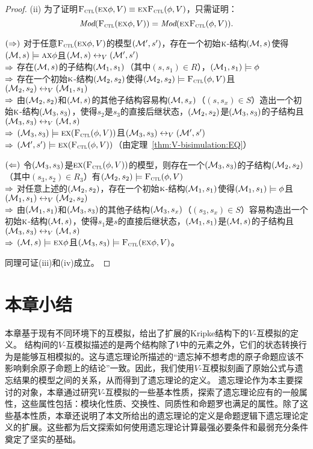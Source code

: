\begin{proof}
(ii) 为了证明${\textsc{F}_{\textsc{ctl}}}(\textsc{e} \textsc{x} \phi, V) \equiv \textsc{e}\textsc{x}{\textsc{F}_{\textsc{ctl}}}(\phi, V)$，只需证明：
\[\textit{Mod}({\textsc{F}_{\textsc{ctl}}}(\textsc{e} \textsc{x} \phi, V)) = \textit{Mod}( \textsc{e}\textsc{x}{\textsc{F}_{\textsc{ctl}}}(\phi, V)).\]

$(\Rightarrow)$ 对于任意${\textsc{F}_{\textsc{ctl}}}(\textsc{e}\textsc{x}\phi,V)$的模型$({\cal M}',s')$，存在一个初始$\textsc{k}$-结构$({\cal M},s)$使得$({\cal M},s)\models \textsc{a}\textsc{x}\phi$且$({\cal M},s)\leftrightarrow_V ({\cal M}',s')$\\
$\Rightarrow$ 存在$({\cal M},s)$的子结构$({\cal M}_1,s_1)$（其中$(s,s_1)\in R$），$({\cal M}_1,s_1)\models \phi$\\
$\Rightarrow$ 存在一个初始$\textsc{k}$-结构$({\cal M}_2,s_2)$使得$({\cal M}_2,s_2)\models {\textsc{F}_{\textsc{ctl}}}(\phi,V)$且$({\cal M}_2,s_2) \leftrightarrow_V ({\cal M}_1,s_1)$\\
$\Rightarrow$ 由$({\cal M}_2,s_2)$和$({\cal M},s)$的其他子结构容易构$({\cal M},s_x)$（$(s,s_x)\in S$）造出一个初始$\textsc{k}$-结构$({\cal M}_3,s_3)$，使得$s_2$是$s_3$的直接后继状态，$({\cal M}_2,s_2)$是$({\cal M}_3,s_3)$的子结构且$({\cal M}_3, s_3)\leftrightarrow_V ({\cal M},s)$\\
$\Rightarrow$ $({\cal M}_3,s_3) \models \textsc{e} \textsc{x}({\textsc{F}_{\textsc{ctl}}}(\phi,V))$且$({\cal M}_3,s_3) \leftrightarrow_V ({\cal M}',s')$\\
$\Rightarrow$ $({\cal M}',s')\models \textsc{e} \textsc{x}({\textsc{F}_{\textsc{ctl}}}(\phi,V))$（由定理~\ref{thm:V-bisimulation:EQ}）

$(\Leftarrow)$ 令$({\cal M}_3,s_3)$是$\textsc{e} \textsc{x}({\textsc{F}_{\textsc{ctl}}}(\phi,V))$的模型，则存在一个$({\cal M}_3,s_3)$的子结构$({\cal M}_2,s_2)$（其中$(s_3,s_2)\in R_3$）有$({\cal M}_2,s_2)\models {\textsc{F}_{\textsc{ctl}}}(\phi,V)$\\
$\Rightarrow$ 对任意上述的$({\cal M}_2,s_2)$，存在一个初始$\textsc{k}$-结构$({\cal M}_1,s_1)$使得$({\cal M}_1,s_1)\models \phi$且$({\cal M}_1,s_1)\leftrightarrow_V ({\cal M}_2,s_2)$\\
$\Rightarrow$ 由$({\cal M}_1,s_1)$和$({\cal M}_3,s_3)$的其他子结构$({\cal M}_3,s_x)$（$(s_3,s_x)\in S$）容易构造出一个初始$\textsc{k}$-结构$({\cal M},s)$，使得$s_1$是$s$的直接后继状态，$({\cal M}_1,s_1)$是$({\cal M},s)$的子结构且$({\cal M}_3, s_3)\leftrightarrow_V ({\cal M},s)$\\
$\Rightarrow$ $({\cal M},s)\models \textsc{e}\textsc{x}\phi$且$({\cal M}_3,s_3)\models {\textsc{F}_{\textsc{ctl}}}(\textsc{e}\textsc{x}\phi,V)$。

同理可证(iii)和(iv)成立。
\end{proof}



\section{本章小结} 
本章基于现有不同环境下的互模拟，给出了扩展的Kripke结构下的$V$-互模拟的定义。
结构间的$V$-互模拟描述的是两个结构除了$V$中的元素之外，它们的状态转换行为是能够互相模拟的。这与遗忘理论所描述的“遗忘掉不想考虑的原子命题应该不影响剩余原子命题上的结论”一致。因此，我们使用$V$-互模拟刻画了原始公式与遗忘结果的模型之间的关系，从而得到了遗忘理论的定义。
遗忘理论作为本主要探讨的对象，本章通过研究$V$-互模拟的一些基本性质，探索了遗忘理论应有的一般属性，这些属性包括：模块化性质、交换性、同质性和命题罗也满足的属性。除了这些基本性质，本章还说明了本文所给出的遗忘理论的定义是命题逻辑下遗忘理论定义的扩展。这些都为后文探索如何使用遗忘理论计算最强必要条件和最弱充分条件奠定了坚实的基础。

